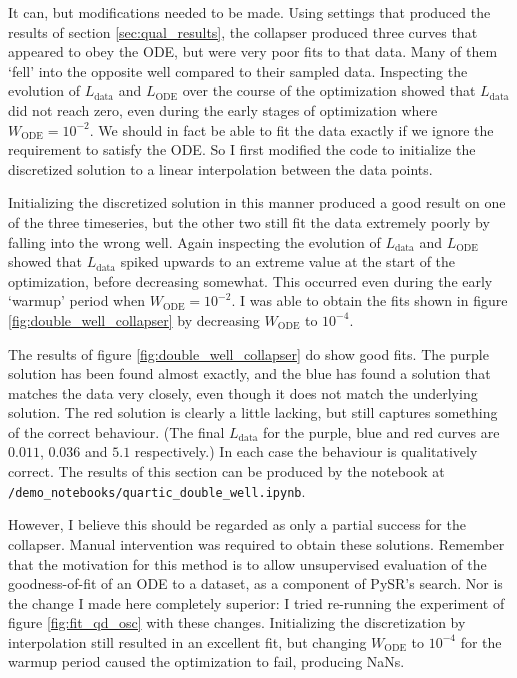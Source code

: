 \documentclass{article}
\begin{document}
It can, but modifications needed to be made.
Using settings that produced the results of section \ref{sec:qual_results}, the collapser produced three curves that appeared to obey the ODE, but were very poor fits to that data.
Many of them `fell' into the opposite well compared to their sampled data.
Inspecting the evolution of $L_{\mathrm{data}}$ and $L_{\mathrm{ODE}}$ over the course of the optimization showed that $L_{\mathrm{data}}$ did not reach zero, even during the early stages of optimization where $W_{\mathrm{ODE}} = 10^{-2}$.
We should in fact be able to fit the data exactly if we ignore the requirement to satisfy the ODE.
So I first modified the code to initialize the discretized solution to a linear interpolation between the data points.

Initializing the discretized solution in this manner produced a good result on one of the three timeseries, but the other two still fit the data extremely poorly by falling into the wrong well.
Again inspecting the evolution of $L_{\mathrm{data}}$ and $L_{\mathrm{ODE}}$ showed that $L_{\mathrm{data}}$ spiked upwards to an extreme value at the start of the optimization, before decreasing somewhat.
This occurred even during the early `warmup' period when $W_{\mathrm{ODE}} = 10^{-2}$.
I was able to obtain the fits shown in figure \ref{fig:double_well_collapser} by decreasing $W_{\mathrm{ODE}}$ to $10^{-4}$.

The results of figure \ref{fig:double_well_collapser} do show good fits.
The purple solution has been found almost exactly, and the blue has found a solution that matches the data very closely, even though it does not match the underlying solution.
The red solution is clearly a little lacking, but still captures something of the correct behaviour.
(The final $L_{\mathrm{data}}$ for the purple, blue and red curves are $0.011$, $0.036$ and $5.1$ respectively.)
In each case the behaviour is qualitatively correct.
The results of this section can be produced by the notebook at \texttt{/demo\_notebooks/quartic\_double\_well.ipynb}.

However, I believe this should be regarded as only a partial success for the collapser.
Manual intervention was required to obtain these solutions.
Remember that the motivation for this method is to allow unsupervised evaluation of the goodness-of-fit of an ODE to a dataset, as a component of PySR's search.
Nor is the change I made here completely superior: I tried re-running the experiment of figure \ref{fig:fit_qd_osc} with these changes.
Initializing the discretization by interpolation still resulted in an excellent fit, but changing $W_{\mathrm{ODE}}$ to $10^{-4}$ for the warmup period caused the optimization to fail, producing NaNs.
\end{document}
